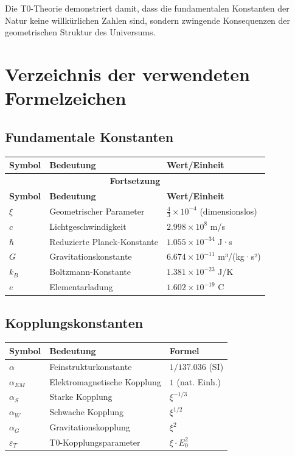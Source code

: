 	Die T0-Theorie demonstriert damit, dass die fundamentalen Konstanten der Natur keine willkürlichen Zahlen sind, sondern zwingende Konsequenzen der geometrischen Struktur des Universums.

\appendix
\section{Verzeichnis der verwendeten Formelzeichen}
\label{app:symbols_de}

\subsection{Fundamentale Konstanten}
\begin{longtable}{lll}
	\toprule
	\textbf{Symbol} & \textbf{Bedeutung} & \textbf{Wert/Einheit} \\
	\midrule
	\endfirsthead
	\multicolumn{3}{c}{{\bfseries Fortsetzung}} \\
	\toprule
	\textbf{Symbol} & \textbf{Bedeutung} & \textbf{Wert/Einheit} \\
	\midrule
	\endhead
	\bottomrule
	\endfoot
	\bottomrule
	\endlastfoot
	
	$\xi$ & Geometrischer Parameter & $\frac{4}{3} \times 10^{-4}$ (dimensionslos) \\
	$c$ & Lichtgeschwindigkeit & $2.998 \times 10^8$ m/s \\
	$\hbar$ & Reduzierte Planck-Konstante & $1.055 \times 10^{-34}$ J·s \\
	$G$ & Gravitationskonstante & $6.674 \times 10^{-11}$ m³/(kg·s²) \\
	$k_B$ & Boltzmann-Konstante & $1.381 \times 10^{-23}$ J/K \\
	$e$ & Elementarladung & $1.602 \times 10^{-19}$ C \\
\end{longtable}

\subsection{Kopplungskonstanten}
\begin{longtable}{lll}
	\toprule
	\textbf{Symbol} & \textbf{Bedeutung} & \textbf{Formel} \\
	\midrule
	$\alpha$ & Feinstrukturkonstante & $1/137.036$ (SI) \\
	$\alpha_{EM}$ & Elektromagnetische Kopplung & $1$ (nat. Einh.) \\
	$\alpha_S$ & Starke Kopplung & $\xi^{-1/3}$ \\
	$\alpha_W$ & Schwache Kopplung & $\xi^{1/2}$ \\
	$\alpha_G$ & Gravitationskopplung & $\xi^{2}$ \\
	$\varepsilon_T$ & T0-Kopplungsparameter & $\xi \cdot E_0^2$ \\
	\bottomrule
\end{longtable}

